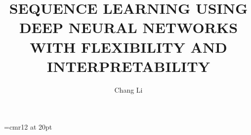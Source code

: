 \documentclass{StyFiles/usydthesis}
\renewcommand{\thepage}{\roman{page}}
\begin{document}
\renewcommand{\thepage}{\roman{page}}	
\font\myfont=cmr12 at 20pt 
\title{{\myfont\bf SEQUENCE LEARNING USING DEEP NEURAL NETWORKS WITH FLEXIBILITY AND INTERPRETABILITY}}
\author{Chang Li}
\def\thisauthor{Chang Li}
\def\degree{Doctor of Philosophy}
\def\department{School of Computer Science \\ Faculty of Engineering}
\def\mydegrees{Doctor of Philosophy (Ph.D.)}
\def\supervisor{Dacheng Tao}
\def\assocsupervisora{Dongjin Song}

\maketitle
% 



\cleardoublepage
\pagestyle{empty}


\cleardoublepage
\pagestyle{empty}


\cleardoublepage
\pagestyle{headings}


\cleardoublepage
\pagestyle{headings}
\tableofcontents
\listoffigures
\listoftables

\setcounter{page}{1}  %



\mainmatter


\end{document}

